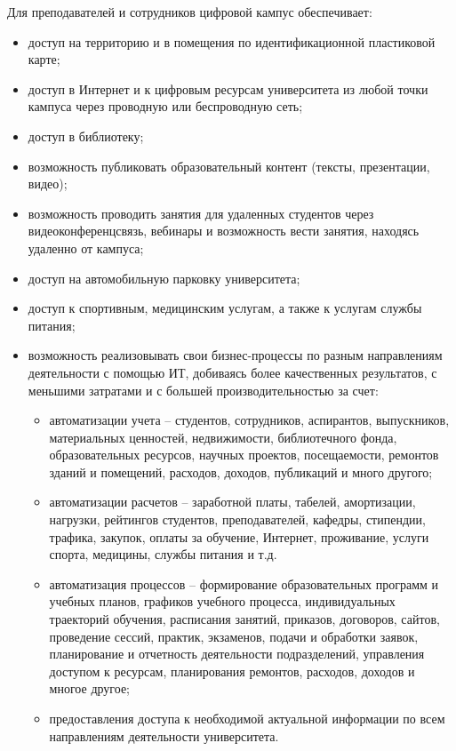 Для преподавателей и сотрудников цифровой кампус обеспечивает:
 \begin{itemize}
	\item доступ на территорию и в помещения  по  идентификационной пластиковой карте;
	\item доступ в Интернет и к цифровым ресурсам университета из любой точки кампуса через проводную или беспроводную сеть;
	\item доступ в библиотеку;
	\item возможность публиковать образовательный контент (тексты, презентации, видео);
	\item возможность проводить занятия для удаленных студентов  через видеоконференцсвязь, вебинары и возможность  вести занятия, находясь удаленно от кампуса;
	\item доступ на автомобильную  парковку университета;
	\item доступ к спортивным, медицинским услугам, а также к услугам службы питания;
	\item возможность реализовывать свои бизнес-процессы по разным направлениям деятельности с помощью ИТ, добиваясь более качественных результатов, с меньшими затратами и с большей производительностью за счет:
	\begin{itemize}
		\item автоматизации учета – студентов, сотрудников, аспирантов, выпускников, материальных ценностей, недвижимости, библиотечного фонда, образовательных ресурсов, научных проектов, посещаемости, ремонтов зданий и помещений, расходов, доходов, публикаций и много другого;
		\item автоматизации расчетов – заработной платы, табелей, амортизации, нагрузки, рейтингов студентов, преподавателей, кафедры, стипендии, трафика, закупок, оплаты  за обучение, Интернет, проживание, услуги спорта,  медицины, службы питания и т.д.
		\item автоматизация процессов – формирование образовательных  программ и учебных планов, графиков учебного процесса, индивидуальных траекторий обучения, расписания занятий, приказов, договоров, сайтов, проведение сессий, практик, экзаменов, подачи и обработки заявок, планирование и отчетность деятельности подразделений, управления доступом к ресурсам, планирования ремонтов, расходов, доходов  и многое другое;
		\item предоставления доступа к необходимой актуальной информации по всем направлениям деятельности университета.
	\end{itemize}
\end{itemize}
